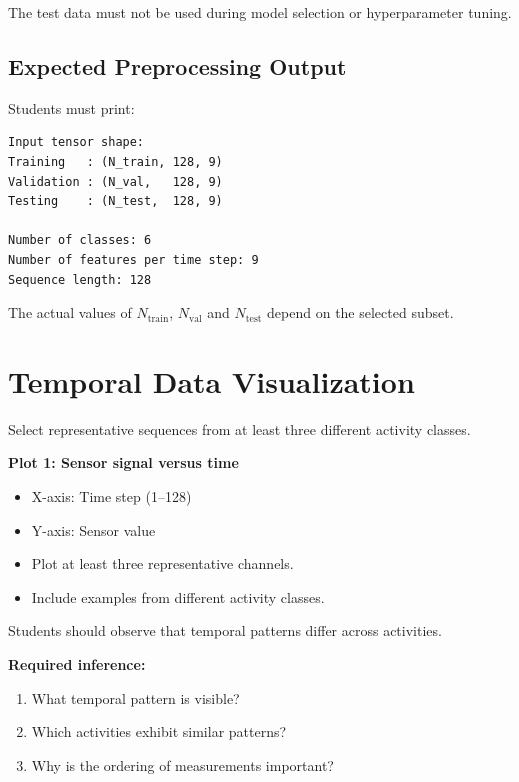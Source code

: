 \documentclass[10pt]{article}
\begin{document}
The test data must not be used during model selection or hyperparameter tuning.

\subsection{Expected Preprocessing Output}

Students must print:

\begin{verbatim}
Input tensor shape:
Training   : (N_train, 128, 9)
Validation : (N_val,   128, 9)
Testing    : (N_test,  128, 9)

Number of classes: 6
Number of features per time step: 9
Sequence length: 128
\end{verbatim}

The actual values of $N_{\mathrm{train}}$, $N_{\mathrm{val}}$ and
$N_{\mathrm{test}}$ depend on the selected subset.

\section{Temporal Data Visualization}

Select representative sequences from at least three different activity
classes.

\textbf{Plot 1: Sensor signal versus time}

\begin{itemize}
\item X-axis: Time step (1--128)
\item Y-axis: Sensor value
\item Plot at least three representative channels.
\item Include examples from different activity classes.
\end{itemize}

Students should observe that temporal patterns differ across activities.

\textbf{Required inference:}

\begin{enumerate}
\item What temporal pattern is visible?
\item Which activities exhibit similar patterns?
\item Why is the ordering of measurements important?
\end{enumerate}

\end{document}
